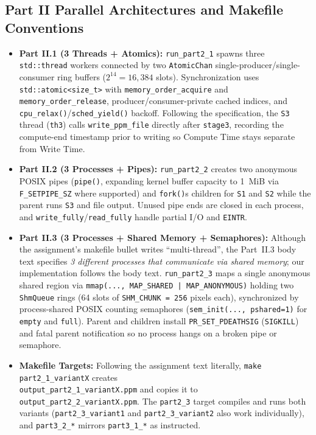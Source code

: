 \documentclass[10pt,a4paper]{article}
\begin{document}
\subsection{Part II Parallel Architectures and Makefile Conventions}
\begin{itemize}
    \item \textbf{Part II.1 (3 Threads + Atomics):} \texttt{run\_part2\_1} spawns three \texttt{std::thread} workers connected by two \texttt{AtomicChan} single-producer/single-consumer ring buffers ($2^{14} = 16{,}384$ slots). Synchronization uses \texttt{std::atomic<size\_t>} with \texttt{memory\_order\_acquire} and \texttt{memory\_order\_release}, producer/consumer-private cached indices, and \texttt{cpu\_relax()}/\texttt{sched\_yield()} backoff. Following the specification, the \texttt{S3} thread (\texttt{th3}) calls \texttt{write\_ppm\_file} directly after \texttt{stage3}, recording the compute-end timestamp prior to writing so Compute Time stays separate from Write Time.
    \item \textbf{Part II.2 (3 Processes + Pipes):} \texttt{run\_part2\_2} creates two anonymous POSIX pipes (\texttt{pipe()}, expanding kernel buffer capacity to 1~MiB via \texttt{F\_SETPIPE\_SZ} where supported) and \texttt{fork()}s children for \texttt{S1} and \texttt{S2} while the parent runs \texttt{S3} and file output. Unused pipe ends are closed in each process, and \texttt{write\_fully}/\texttt{read\_fully} handle partial I/O and \texttt{EINTR}.
    \item \textbf{Part II.3 (3 Processes + Shared Memory + Semaphores):} Although the assignment's makefile bullet writes ``multi-thread'', the Part~II.3 body text specifies \emph{3 different processes that communicate via shared memory}; our implementation follows the body text. \texttt{run\_part2\_3} maps a single anonymous shared region via \texttt{mmap(..., MAP\_SHARED | MAP\_ANONYMOUS)} holding two \texttt{ShmQueue} rings (64 slots of \texttt{SHM\_CHUNK = 256} pixels each), synchronized by process-shared POSIX counting semaphores (\texttt{sem\_init(..., pshared=1)} for \texttt{empty} and \texttt{full}). Parent and children install \texttt{PR\_SET\_PDEATHSIG} (\texttt{SIGKILL}) and fatal parent notification so no process hangs on a broken pipe or semaphore.
    \item \textbf{Makefile Targets:} Following the assignment text literally, \texttt{make part2\_1\_variantX} creates\\ \texttt{output\_part2\_1\_variantX.ppm} and copies it to \texttt{output\_part2\_2\_variantX.ppm}. The \texttt{part2\_3} target compiles and runs both variants (\texttt{part2\_3\_variant1} and \texttt{part2\_3\_variant2} also work individually), and \texttt{part3\_2\_*} mirrors \texttt{part3\_1\_*} as instructed.
\end{itemize}
\end{document}
